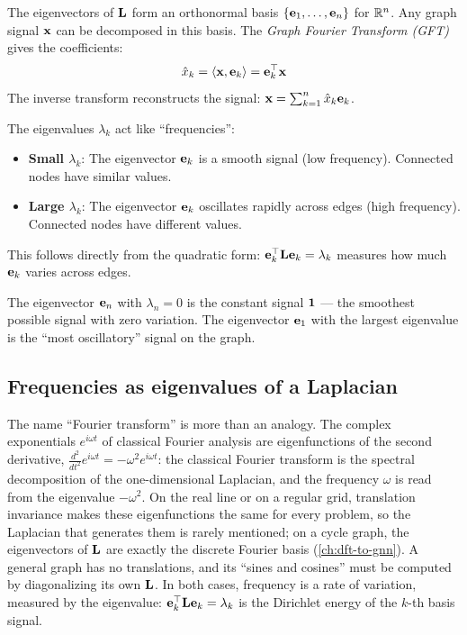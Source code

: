 \begin{notechapter}
\begin{definition}\label{graph-laplacians:def:gft}
The eigenvectors of $\mathbf{L}$ form an orthonormal basis $\{\mathbf{e}_1, \ldots, \mathbf{e}_n\}$ for $\mathbb{R}^n$. Any graph signal $\mathbf{x}$ can be decomposed in this basis. The \emph{Graph Fourier Transform (GFT)} gives the coefficients:
\begin{equation}
\hat{x}_k = \langle \mathbf{x}, \mathbf{e}_k \rangle = \mathbf{e}_k^\top \mathbf{x}
\end{equation}
The inverse transform reconstructs the signal: $\mathbf{x} = \sum_{k=1}^{n} \hat{x}_k \mathbf{e}_k$.
\end{definition}

\begin{intuition}
The eigenvalues $\lambda_k$ act like ``frequencies'':
\begin{itemize}
    \item \textbf{Small $\lambda_k$}: The eigenvector $\mathbf{e}_k$ is a smooth signal (low frequency). Connected nodes have similar values.
    \item \textbf{Large $\lambda_k$}: The eigenvector $\mathbf{e}_k$ oscillates rapidly across edges (high frequency). Connected nodes have different values.
\end{itemize}
This follows directly from the quadratic form: $\mathbf{e}_k^\top \mathbf{L} \mathbf{e}_k = \lambda_k$ measures how much $\mathbf{e}_k$ varies across edges.

The eigenvector $\mathbf{e}_n$ with $\lambda_n = 0$ is the constant signal $\mathbf{1}$ --- the smoothest possible signal with zero variation. The eigenvector $\mathbf{e}_1$ with the largest eigenvalue is the ``most oscillatory'' signal on the graph.
\end{intuition}

\subsection{Frequencies as eigenvalues of a Laplacian}\label{graph-laplacians:sec:frequencies}

The name ``Fourier transform'' is more than an analogy. The complex exponentials $e^{i\omega t}$ of classical
Fourier analysis are eigenfunctions of the second derivative, $\frac{d^2}{dt^2}e^{i\omega t} = -\omega^2e^{i\omega t}$: the classical Fourier transform is
the spectral decomposition of the one-dimensional Laplacian, and the frequency $\omega$ is read from the
eigenvalue $-\omega^2$. On the real line or on a regular grid, translation invariance makes these eigenfunctions
the same for every problem, so the Laplacian that generates them is rarely mentioned; on a
cycle graph, the eigenvectors of $\mathbf{L}$ are exactly the discrete Fourier basis (\cref{ch:dft-to-gnn}). A general graph has no
translations, and its ``sines and cosines'' must be computed by diagonalizing its own $\mathbf{L}$. In both
cases, frequency is a rate of variation, measured by the eigenvalue: $\mathbf{e}_k^\top\mathbf{L}\mathbf{e}_k = \lambda_k$ is the Dirichlet energy of the
$k$-th basis signal.


\end{notechapter}
